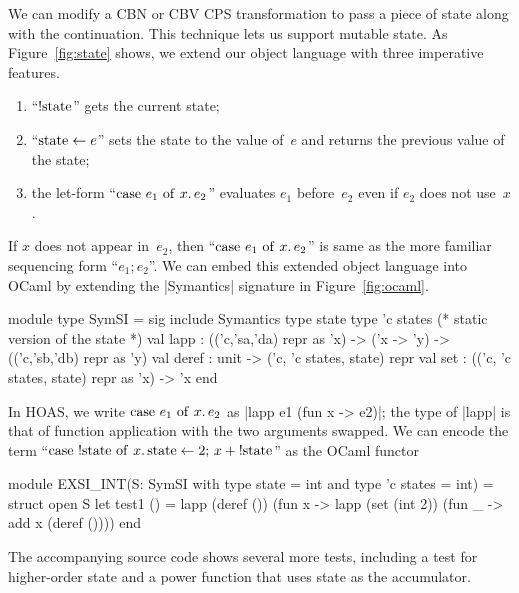 We can modify a CBN or CBV CPS transformation to pass a piece of state
along with the continuation. This technique lets us support mutable
state. As Figure~\ref{fig:state} shows, we extend our object language
with three imperative features.
\begin{enumerate}
    \item ``$\mathrm{!state}$'' gets the current state;
    \item ``$\mathrm{state}\leftarrow e$'' sets the state to the value of~$e$ and returns
        the previous value of the state;
    \item the let-form ``$\mathrm{case\ }e_1\mathrm{\ of\ }x.\,e_2$'' evaluates $e_1$
        before~$e_2$ even if $e_2$ does not use~$x$.
\end{enumerate}
If $x$ does not appear in~$e_2$, then ``$\mathrm{case\ }e_1\mathrm{\ of\ }x.\,e_2$'' is same as
the more familiar sequencing form ``$e_1;e_2$''.
We can embed this extended object language into OCaml by extending the
|Symantics| signature in Figure~\ref{fig:ocaml}.
\begin{code}
module type SymSI = sig
  include Symantics
  type state
  type 'c states       (* static version of the state *)
  val lapp : (('c,'sa,'da) repr as 'x) -> ('x -> 'y)
             -> (('c,'sb,'db) repr as 'y)
  val deref : unit -> ('c, 'c states, state) repr
  val set   : (('c, 'c states, state) repr as 'x) -> 'x
end
\end{code}
In HOAS, we write $\mathrm{case\ }e_1\mathrm{\ of\ }x.\,e_2$ as |lapp e1 (fun x -> e2)|;
the type of |lapp| is that of function application with
the two arguments swapped.  We can encode the term
``$\mathrm{case\ }\mathrm{!state}\mathrm{\ of\ }x.\, \mathrm{state}\leftarrow 2;\, x+\mathrm{!state}$''
as the OCaml functor
\begin{code}
module EXSI_INT(S: SymSI
  with type state = int and type 'c states = int) = struct open S
  let test1 () = lapp (deref ()) (fun x -> 
                  lapp (set (int 2)) (fun _ -> add x (deref ())))
end
\end{code}
The accompanying source code shows several more tests, including
a test for higher-order state and a power function that uses state
as the accumulator.

